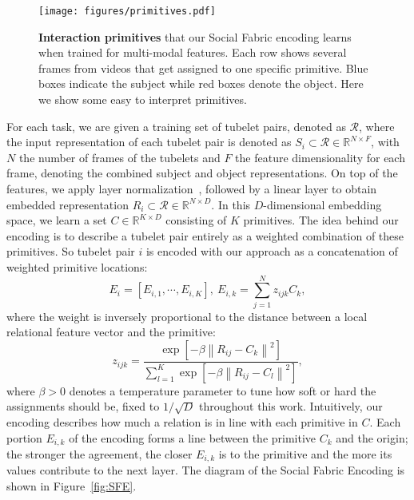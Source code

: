 \documentclass[10pt,twocolumn,letterpaper]{article}
\begin{document}
\begin{figure}[t!]
\centering
    \texttt{[image: figures/primitives.pdf]}
  \caption{\textbf{Interaction primitives} that our Social Fabric encoding learns when trained for multi-modal features. Each row shows several frames from videos that get assigned to one specific primitive. Blue boxes indicate the subject while red boxes denote the object. Here we show some easy to interpret primitives. 
  }
\label{fig:primitives}
\end{figure}


For each task, we are given a training set of tubelet pairs, denoted as $\mathcal{R}$, where the input representation of each tubelet pair is denoted as $S_i \subset \mathcal{R} \in \mathbb{R}^{N \times F}$, with $N$ the number of frames of the tubelets and $F$ the feature dimensionality for each frame, denoting the combined subject and object representations. On top of the features, we apply layer normalization~\cite{ba2016layer}, followed by a linear layer to obtain embedded representation $R_i \subset \mathcal{R} \in \mathbb{R}^{N \times D}$. In this $D$-dimensional embedding space, we learn a set $C \in \mathbb{R}^{K \times D}$ consisting of $K$ primitives. The idea behind our encoding is to describe a tubelet pair entirely as a weighted combination of these primitives. So tubelet pair $i$ is encoded with our approach as a concatenation of weighted primitive locations:
\begin{equation}
E_i {=} [E_{i,1},\cdots,E_{i,K}], \
E_{i,k} {=} \sum_{j=1}^N {z_{ijk} C_{k}},
\end{equation}
where the weight is inversely proportional to the distance between a local relational feature vector and the primitive:
\begin{equation}
z_{ijk} = \frac{\exp \left[ -\beta  \left\| R_{ij} - C_k \right\|^2 \right]}{\sum_{l=1}^{K} \exp \left[ -\beta \left\| R_{ij} - C_l \right\|^2 \right]}, \label{equ:zij}
\end{equation}
where $\beta > 0$ denotes a temperature parameter to tune how soft or hard the assignments should be, fixed to $1/\sqrt{D}$ throughout this work. Intuitively, our encoding describes how much a relation is in line with each primitive in $C$. Each portion $E_{i,k}$ of the encoding forms a line between the primitive $C_k$ and the origin; the stronger the agreement, the closer $E_{i,k}$ is to the primitive and the more its values contribute to the next layer. The diagram of the Social Fabric Encoding is shown in Figure~\ref{fig:SFE}.
\end{document}
